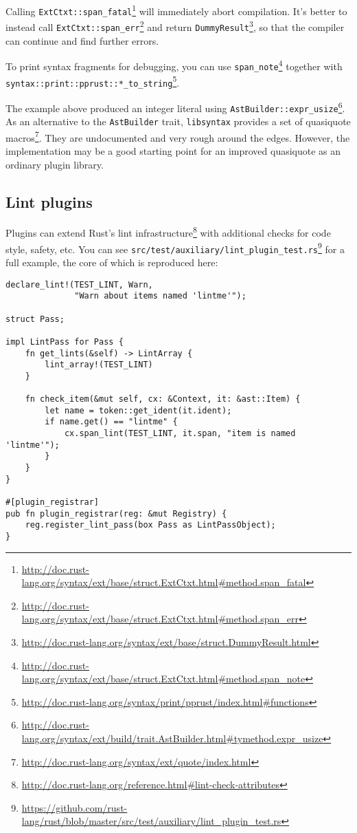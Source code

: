 \documentclass[a4paper,]{book}
\renewcommand{\href}[2]{#2\footnote{\url{#1}}}
\begin{document}
Calling
\href{http://doc.rust-lang.org/syntax/ext/base/struct.ExtCtxt.html\#method.span_fatal}{\texttt{ExtCtxt::span\_fatal}}
will immediately abort compilation. It's better to instead call
\href{http://doc.rust-lang.org/syntax/ext/base/struct.ExtCtxt.html\#method.span_err}{\texttt{ExtCtxt::span\_err}}
and return
\href{http://doc.rust-lang.org/syntax/ext/base/struct.DummyResult.html}{\texttt{DummyResult}},
so that the compiler can continue and find further errors.

To print syntax fragments for debugging, you can use
\href{http://doc.rust-lang.org/syntax/ext/base/struct.ExtCtxt.html\#method.span_note}{\texttt{span\_note}}
together with
\href{http://doc.rust-lang.org/syntax/print/pprust/index.html\#functions}{\texttt{syntax::print::pprust::*\_to\_string}}.

The example above produced an integer literal using
\href{http://doc.rust-lang.org/syntax/ext/build/trait.AstBuilder.html\#tymethod.expr_usize}{\texttt{AstBuilder::expr\_usize}}.
As an alternative to the \texttt{AstBuilder} trait, \texttt{libsyntax}
provides a set of
\href{http://doc.rust-lang.org/syntax/ext/quote/index.html}{quasiquote
macros}. They are undocumented and very rough around the edges. However,
the implementation may be a good starting point for an improved
quasiquote as an ordinary plugin library.

\subsection{Lint plugins}\label{lint-plugins}

Plugins can extend
\href{http://doc.rust-lang.org/reference.html\#lint-check-attributes}{Rust's
lint infrastructure} with additional checks for code style, safety, etc.
You can see
\href{https://github.com/rust-lang/rust/blob/master/src/test/auxiliary/lint_plugin_test.rs}{\texttt{src/test/auxiliary/lint\_plugin\_test.rs}}
for a full example, the core of which is reproduced here:

\begin{verbatim}
declare_lint!(TEST_LINT, Warn,
              "Warn about items named 'lintme'");

struct Pass;

impl LintPass for Pass {
    fn get_lints(&self) -> LintArray {
        lint_array!(TEST_LINT)
    }

    fn check_item(&mut self, cx: &Context, it: &ast::Item) {
        let name = token::get_ident(it.ident);
        if name.get() == "lintme" {
            cx.span_lint(TEST_LINT, it.span, "item is named 'lintme'");
        }
    }
}

#[plugin_registrar]
pub fn plugin_registrar(reg: &mut Registry) {
    reg.register_lint_pass(box Pass as LintPassObject);
}
\end{verbatim}
\end{document}
